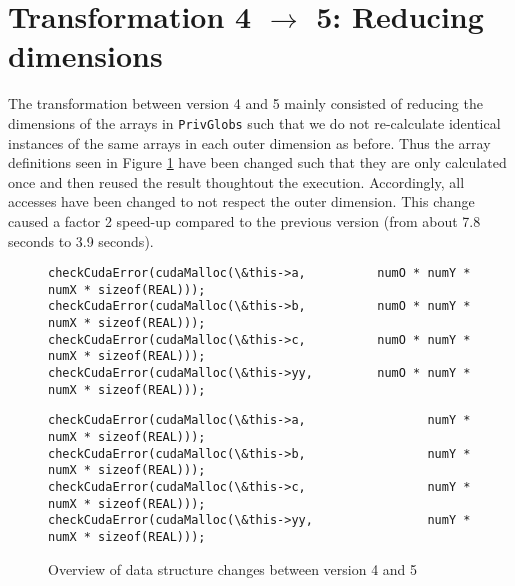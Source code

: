 \section{Transformation 4 $\rightarrow$ 5: Reducing dimensions}
The transformation between version 4 and 5 mainly consisted of reducing the dimensions of the arrays in \texttt{PrivGlobs} such that we do not re-calculate identical instances of the same arrays in each outer dimension as before.\n
Thus the array definitions seen in Figure \ref{dimreductions} have been changed such that they are only calculated once and then reused the result thoughtout the execution. Accordingly, all accesses have been changed to not respect the outer dimension.\n
This change caused a factor 2 speed-up compared to the previous version
(from about 7.8 seconds to 3.9 seconds).


\begin{figure}[H]
    \centering
\begin{Verbatim}[label={4\_OuterParallelCuda/ProjHelperFun.h}]
checkCudaError(cudaMalloc(\&this->a,          numO * numY * numX * sizeof(REAL)));
checkCudaError(cudaMalloc(\&this->b,          numO * numY * numX * sizeof(REAL)));
checkCudaError(cudaMalloc(\&this->c,          numO * numY * numX * sizeof(REAL)));
checkCudaError(cudaMalloc(\&this->yy,         numO * numY * numX * sizeof(REAL)));
\end{Verbatim}
\vspace{2mm}
\begin{Verbatim}[label={5\_ReducedCudaDimensions/ProjHelperFun.h}]
checkCudaError(cudaMalloc(\&this->a,                 numY * numX * sizeof(REAL)));
checkCudaError(cudaMalloc(\&this->b,                 numY * numX * sizeof(REAL)));
checkCudaError(cudaMalloc(\&this->c,                 numY * numX * sizeof(REAL)));
checkCudaError(cudaMalloc(\&this->yy,                numY * numX * sizeof(REAL)));
\end{Verbatim}
\caption{Overview of data structure changes between version 4 and 5\label{dimreductions}}
\end{figure}

